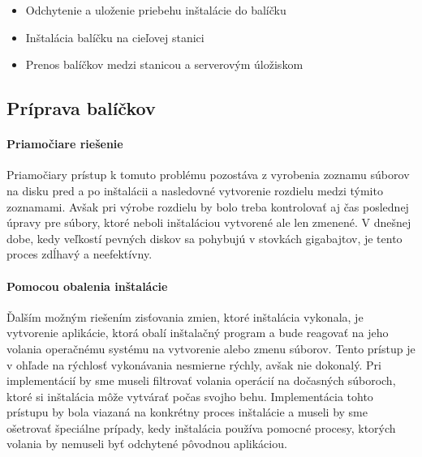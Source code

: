 \begin{itemize}
\item Odchytenie a uloženie priebehu inštalácie do balíčku
\item Inštalácia balíčku na cieľovej stanici
\item Prenos balíčkov medzi stanicou a serverovým úložiskom
\end{itemize}

\subsection{Príprava balíčkov}

\paragraph{Priamočiare riešenie}
Priamočiary prístup k tomuto problému pozostáva z vyrobenia zoznamu súborov na disku pred a po inštalácii a nasledovné vytvorenie rozdielu medzi týmito zoznamami. Avšak pri výrobe rozdielu by bolo treba kontrolovať aj čas poslednej úpravy pre súbory, ktoré neboli inštaláciou vytvorené ale len zmenené. V dnešnej dobe, kedy veľkostí pevných diskov sa pohybujú v stovkách gigabajtov, je tento proces zdĺhavý a neefektívny. 
\paragraph{Pomocou obalenia inštalácie}
Ďalším možným riešením zisťovania zmien, ktoré inštalácia vykonala, je vytvorenie aplikácie, ktorá obalí inštalačný program a bude reagovať na jeho volania operačnému systému na vytvorenie alebo zmenu súborov. Tento prístup je v ohľade na rýchlosť vykonávania nesmierne rýchly, avšak nie dokonalý. Pri implementácií by sme museli filtrovať volania operácií na dočasných súboroch, ktoré si inštalácia môže vytvárať počas svojho behu. Implementácia tohto prístupu by bola viazaná na konkrétny proces inštalácie a museli by sme ošetrovať špeciálne prípady, kedy inštalácia používa pomocné procesy, ktorých volania by nemuseli byť odchytené pôvodnou aplikáciou. 
